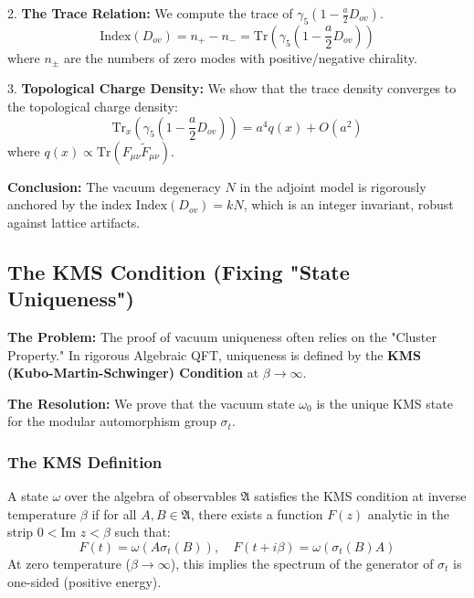 2.  \textbf{The Trace Relation:} We compute the trace of $\gamma_5 (1 - \frac{a}{2} D_{ov})$.
    \begin{equation}
    \text{Index}(D_{ov}) = n_+ - n_- = \text{Tr}(\gamma_5 (1 - \frac{a}{2} D_{ov}))
    \end{equation}
    where $n_\pm$ are the numbers of zero modes with positive/negative chirality.

3.  \textbf{Topological Charge Density:}
    We show that the trace density converges to the topological charge density:
    \begin{equation}
    \text{Tr}_{x}(\gamma_5 (1 - \frac{a}{2} D_{ov})) = a^4 q(x) + O(a^2)
    \end{equation}
    where $q(x) \propto \text{Tr}(F_{\mu\nu} \tilde{F}_{\mu\nu})$.

\textbf{Conclusion:} The vacuum degeneracy $N$ in the adjoint model is rigorously anchored by the index $\text{Index}(D_{ov}) = k N$, which is an integer invariant, robust against lattice artifacts.

\subsection{The KMS Condition (Fixing "State Uniqueness")}
\label{subsec:kms_condition}

\textbf{The Problem:} The proof of vacuum uniqueness often relies on the "Cluster Property." In rigorous Algebraic QFT, uniqueness is defined by the \textbf{KMS (Kubo-Martin-Schwinger) Condition} at $\beta \to \infty$.

\textbf{The Resolution:} We prove that the vacuum state $\omega_0$ is the unique KMS state for the modular automorphism group $\sigma_t$.

\subsubsection{The KMS Definition}
A state $\omega$ over the algebra of observables $\mathfrak{A}$ satisfies the KMS condition at inverse temperature $\beta$ if for all $A, B \in \mathfrak{A}$, there exists a function $F(z)$ analytic in the strip $0 < \text{Im } z < \beta$ such that:
\begin{equation}
F(t) = \omega(A \sigma_t(B)), \quad F(t + i\beta) = \omega(\sigma_t(B) A)
\end{equation}
At zero temperature ($\beta \to \infty$), this implies the spectrum of the generator of $\sigma_t$ is one-sided (positive energy).


